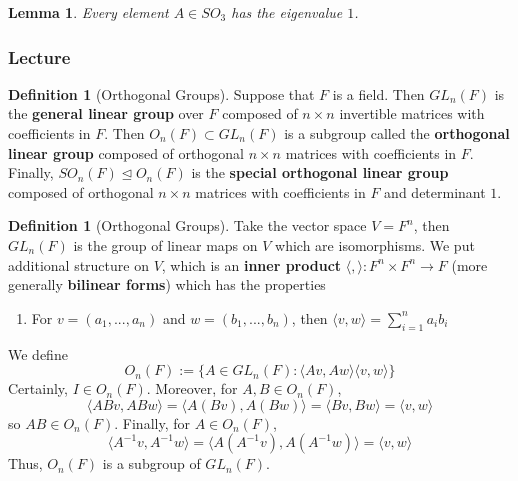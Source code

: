 \documentclass[12pt]{article}
\newtheorem{lem}[thm]{Lemma}  %
\theoremstyle{definition}
\newtheorem{defn}[thm]{Definition}
\theoremstyle{remark}
\numberwithin{equation}{section}
\newcommand\B[1]{\textbf{ #1}}
\newcommand\nsub{\trianglelefteq}
\begin{document}
\vspace{15pt}


\begin{lem}
        Every element $A \in SO_3$ has the eigenvalue $1$.
\end{lem}

\vspace{15pt}

\subsubsection{Lecture}


\begin{defn}[Orthogonal Groups]
        Suppose that $F$ is a field. Then $GL_n(F)$ is the \B{general linear group} over $F$ composed of $n\times n$ invertible matrices with coefficients in $F$. Then $O_n(F) \subset GL_n(F)$ is a subgroup called the \B{orthogonal linear group} composed of orthogonal $n\times n$ matrices with coefficients in $F$. Finally, $SO_n(F) \nsub O_n(F)$ is the \B{special orthogonal linear group} composed of orthogonal $n\times n$ matrices with coefficients in $F$ and determinant $1$.
\end{defn}


\vspace{15pt}

\begin{defn}[Orthogonal Groups]
        Take the vector space $V = F^n$, then $GL_n(F)$ is the group of linear maps on $V$ which are isomorphisms. We put additional structure on $V$, which is an \B{inner product} $\langle , \rangle: F^n\times F^n \rightarrow F$ (more generally \B{bilinear forms}) which has the properties \begin{enumerate}
                \item For $v = (a_1,...,a_n)$ and $w = (b_1,...,b_n)$, then $\langle v, w \rangle = \sum\limits_{i=1}^na_ib_i$
        \end{enumerate}
        We define \begin{equation}
                O_n(F) := \{A \in GL_n(F): \langle Av, Aw\rangle \langle v, w \rangle \}
        \end{equation}
        Certainly, $I \in O_n(F)$. Moreover, for $A,B \in O_n(F)$, $$\langle ABv, ABw\rangle = \langle A(Bv), A(Bw) \rangle = \langle Bv, Bw \rangle = \langle v, w \rangle$$ so $AB \in O_n(F)$. Finally, for $A \in O_n(F)$, \begin{equation}
                \langle A^{-1}v, A^{-1}w \rangle = \langle A(A^{-1}v), A(A^{-1}w) \rangle = \langle v, w \rangle
        \end{equation}
        Thus, $O_n(F)$ is a subgroup of $GL_n(F)$. 
\end{defn}
\end{document}
